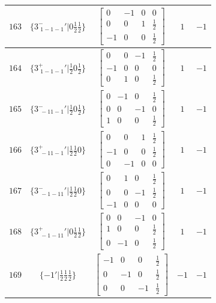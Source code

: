 \documentclass[fleqn,8pt]{jsarticle}
\begin{document}
\begin{longtable}{ccccc}
$ 163 $ & $ \{3^{-}_{\,\,1-1-1}{}'|0 \frac{1}{2} \frac{1}{2}\} $ & $ \begin{bmatrix} 0 & -1 & 0 & 0 \\ 0 & 0 & 1 & \frac{1}{2} \\ -1 & 0 & 0 & \frac{1}{2} \end{bmatrix} $ & $ 1 $ & $ -1 $ \\ \hline
$ 164 $ & $ \{3^{+}_{\,\,1-1-1}{}'|\frac{1}{2} 0 \frac{1}{2}\} $ & $ \begin{bmatrix} 0 & 0 & -1 & \frac{1}{2} \\ -1 & 0 & 0 & 0 \\ 0 & 1 & 0 & \frac{1}{2} \end{bmatrix} $ & $ 1 $ & $ -1 $ \\ \hline
$ 165 $ & $ \{3^{-}_{\,\,-11-1}{}'|\frac{1}{2} 0 \frac{1}{2}\} $ & $ \begin{bmatrix} 0 & -1 & 0 & \frac{1}{2} \\ 0 & 0 & -1 & 0 \\ 1 & 0 & 0 & \frac{1}{2} \end{bmatrix} $ & $ 1 $ & $ -1 $ \\ \hline
$ 166 $ & $ \{3^{+}_{\,\,-11-1}{}'|\frac{1}{2} \frac{1}{2} 0\} $ & $ \begin{bmatrix} 0 & 0 & 1 & \frac{1}{2} \\ -1 & 0 & 0 & \frac{1}{2} \\ 0 & -1 & 0 & 0 \end{bmatrix} $ & $ 1 $ & $ -1 $ \\ \hline
$ 167 $ & $ \{3^{-}_{\,\,-1-11}{}'|\frac{1}{2} \frac{1}{2} 0\} $ & $ \begin{bmatrix} 0 & 1 & 0 & \frac{1}{2} \\ 0 & 0 & -1 & \frac{1}{2} \\ -1 & 0 & 0 & 0 \end{bmatrix} $ & $ 1 $ & $ -1 $ \\ \hline
$ 168 $ & $ \{3^{+}_{\,\,-1-11}{}'|0 \frac{1}{2} \frac{1}{2}\} $ & $ \begin{bmatrix} 0 & 0 & -1 & 0 \\ 1 & 0 & 0 & \frac{1}{2} \\ 0 & -1 & 0 & \frac{1}{2} \end{bmatrix} $ & $ 1 $ & $ -1 $ \\ \hline
$ 169 $ & $ \{-1{}'|\frac{1}{2} \frac{1}{2} \frac{1}{2}\} $ & $ \begin{bmatrix} -1 & 0 & 0 & \frac{1}{2} \\ 0 & -1 & 0 & \frac{1}{2} \\ 0 & 0 & -1 & \frac{1}{2} \end{bmatrix} $ & $ -1 $ & $ -1 $ \\ \hline

\end{longtable}
\end{document}
